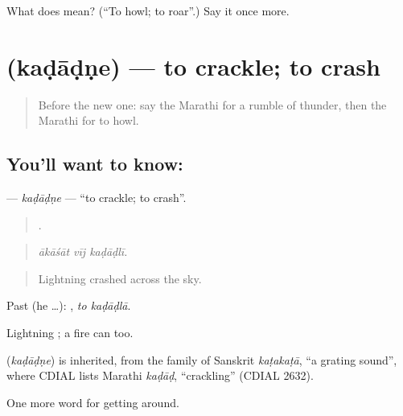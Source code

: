 \begin{tcolorbox}[breakable,colback=teal!4,colframe=teal!35!black,title={Before you move on}]
What does  mean? (\textquotedblleft{}To howl; to roar\textquotedblright{}.) Say it once more.
\end{tcolorbox}
\section[\texorpdfstring{\mr{कडाडणे} (kaḍāḍṇe)}{कडाडणे (kaḍāḍṇe)}]{ (kaḍāḍṇe) — to crackle; to crash}

\label{lesson:MR-C439-kadadne}



\begin{quote}
Before the new one: say the Marathi for a rumble of thunder, then the Marathi for to howl.
\end{quote}

\subsection*{You'll want to know: }
\textbf{} — \emph{kaḍāḍṇe} — \textquotedblleft{}to crackle; to crash\textquotedblright{}.

\begin{quote}
  .
\end{quote}

\begin{quote}
\emph{ākāśāt vīj kaḍāḍlī.}
\end{quote}

\begin{quote}
Lightning crashed across the sky.
\end{quote}

Past (he …):  , \emph{to kaḍāḍlā}.

Lightning ; a fire can  too.

\begin{cousinweb}
\textbf{} (\emph{kaḍāḍṇe}) is inherited, from the family of Sanskrit \emph{kaṭakaṭā}, \textquotedblleft{}a grating sound\textquotedblright{}, where CDIAL lists Marathi \emph{kaḍāḍ}, \textquotedblleft{}crackling\textquotedblright{} (CDIAL 2632).
\end{cousinweb}

\begin{grammarlens}[title={What you've built}]
One more word for getting around.
\end{grammarlens}

